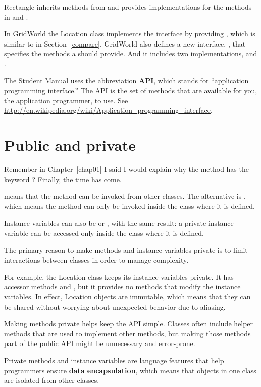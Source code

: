 Rectangle inherits methods from  and provides implementations for the methods in  and .

In GridWorld the Location class implements the  interface by providing , which is similar to  in Section~\ref{compare}.
%
GridWorld also defines a new interface, , that specifies the methods a  should provide.
And it includes two implementations,  and .

The Student Manual uses the abbreviation {\bf API}, which stands for ``application programming interface.''
The API is the set of methods that are available for you, the application programmer, to use.
See \url{http://en.wikipedia.org/wiki/Application_programming_interface}.


\section{Public and private}

Remember in Chapter~\ref{chap01} I said I would explain why the  method has the keyword ?
Finally, the time has come.

 means that the method can be invoked from other classes.
The alternative is , which means the method can only be invoked inside the class where it is defined.

Instance variables can also be  or , with the same result: a private instance variable can be accessed only inside the class where it is defined.

The primary reason to make methods and instance variables private is to limit interactions between classes in order to manage complexity.

For example, the Location class keeps its instance variables private.
It has accessor methods  and , but it provides no methods that modify the instance variables.
In effect, Location objects are immutable, which means that they can be shared without worrying about unexpected behavior due to aliasing.

Making methods private helps keep the API simple.
Classes often include helper methods that are used to implement other methods, but making those methods part of the public API might be unnecessary and error-prone.

Private methods and instance variables are language features that help programmers ensure {\bf data encapsulation}, which means that objects in one class are isolated from other classes.


